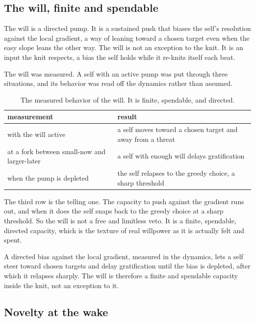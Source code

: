 \subsection{The will, finite and spendable}

The will is a directed pump. It is a sustained push that biases the self's resolution against the local gradient, a way of leaning toward a chosen target even when the easy slope leans the other way. The will is not an exception to the knit. It is an input the knit respects, a bias the self holds while it re-knits itself each beat.

The will was measured. A self with an active pump was put through three situations, and its behavior was read off the dynamics rather than assumed.

\begin{table}[ht]
\centering
\begin{tabular}{@{}ll@{}}
\toprule
measurement & result \\
\midrule
with the will active & a self moves toward a chosen target and away from a threat \\
at a fork between small-now and larger-later & a self with enough will delays gratification \\
when the pump is depleted & the self relapses to the greedy choice, a sharp threshold \\
\bottomrule
\end{tabular}
\caption{The measured behavior of the will. It is finite, spendable, and directed.}
\label{tab:will-measured}
\end{table}

The third row is the telling one. The capacity to push against the gradient runs out, and when it does the self snaps back to the greedy choice at a sharp threshold. So the will is not a free and limitless veto. It is a finite, spendable, directed capacity, which is the texture of real willpower as it is actually felt and spent.

\begin{result}
A directed bias against the local gradient, measured in the dynamics, lets a self steer toward chosen targets and delay gratification until the bias is depleted, after which it relapses sharply. The will is therefore a finite and spendable capacity inside the knit, not an exception to it.
\end{result}

\subsection{Novelty at the wake}

